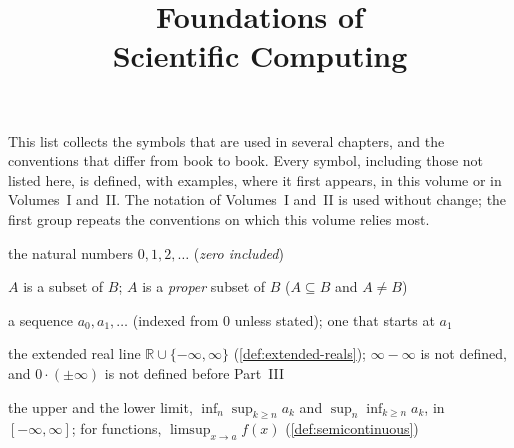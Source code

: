 \documentclass{sdbook-eng}
\title{Foundations of\\Scientific Computing}
\author{}
\date{}
\begin{document}
\frontmatter
\maketitle
\tableofcontents

\notationchapter
This list collects the symbols that are used in several chapters, and the conventions that differ from book to book. Every symbol, including those not listed here, is defined, with examples, where it first appears, in this volume or in Volumes~I and~II. The notation of Volumes~I and~II is used without change; the first group repeats the conventions on which this volume relies most.


\begin{symbols}
\item[$\mathbb N$] the natural numbers $0,1,2,\ldots$ (\emph{zero included})
\item[$A\subseteq B$, $A\subset B$] $A$ is a subset of $B$; $A$ is a \emph{proper} subset of $B$ ($A\subseteq B$ and $A\ne B$)
\item[$(a_n)$, $(a_n)_{n\ge1}$] a sequence $a_0,a_1,\ldots$ (indexed from $0$ unless stated); one that starts at $a_1$
\end{symbols}

\begin{symbols}
\item[{$[-\infty,\infty]$}] the extended real line $\mathbb R\cup\{-\infty,\infty\}$ (\cref{def:extended-reals}); $\infty-\infty$ is not defined, and $0\cdot(\pm\infty)$ is not defined before Part~III
\item[$\limsup a_n$, $\liminf a_n$] the upper and the lower limit, $\inf_n\sup_{k\ge n}a_k$ and $\sup_n\inf_{k\ge n}a_k$, in $[-\infty,\infty]$; for functions, $\limsup_{x\to a}f(x)$ (\cref{def:semicontinuous})
\end{symbols}
\end{document}
